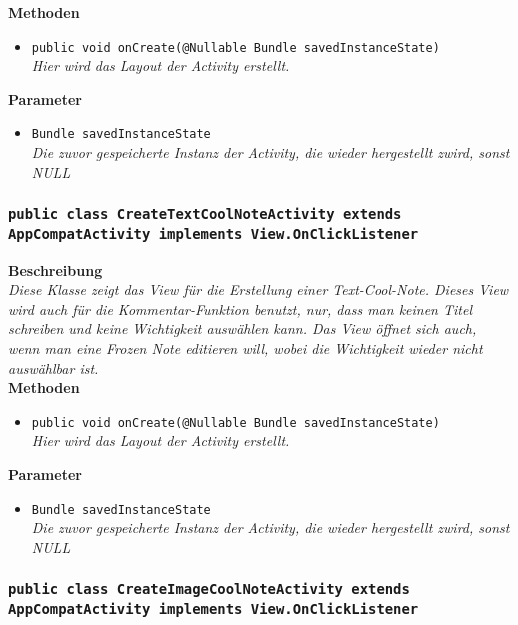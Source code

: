 	\textbf{Methoden}
	\begin{itemize}
		\item\texttt{{public void onCreate(@Nullable Bundle savedInstanceState)}}\\
	\textit{Hier wird das Layout der Activity erstellt.}\\
	\end{itemize}

	\textbf{Parameter}
	\begin{itemize}
		\item\texttt{Bundle savedInstanceState}\\ 
	\textit{Die zuvor gespeicherte Instanz der Activity, die wieder hergestellt zwird, sonst NULL}\\
	\end{itemize} 

\subsubsection{\texttt{public class CreateTextCoolNoteActivity extends AppCompatActivity implements View.OnClickListener}}

	\textbf{Beschreibung} \\
	\textit{Diese Klasse zeigt das View für die Erstellung einer Text-Cool-Note. Dieses View wird auch für die Kommentar-Funktion benutzt, nur, dass man keinen Titel schreiben und keine Wichtigkeit auswählen kann. Das View öffnet sich auch, wenn man eine Frozen Note editieren will, wobei die Wichtigkeit wieder nicht auswählbar ist.} \\

	\textbf{Methoden}
	\begin{itemize}
		\item\texttt{{public void onCreate(@Nullable Bundle savedInstanceState)}}\\
	\textit{Hier wird das Layout der Activity erstellt.}\\
	\end{itemize}

	\textbf{Parameter}
	\begin{itemize}
		\item\texttt{Bundle savedInstanceState}\\  
	\textit{Die zuvor gespeicherte Instanz der Activity, die wieder hergestellt zwird, sonst NULL}\\
	\end{itemize} 


\subsubsection{\texttt{public class CreateImageCoolNoteActivity extends AppCompatActivity implements View.OnClickListener}}

